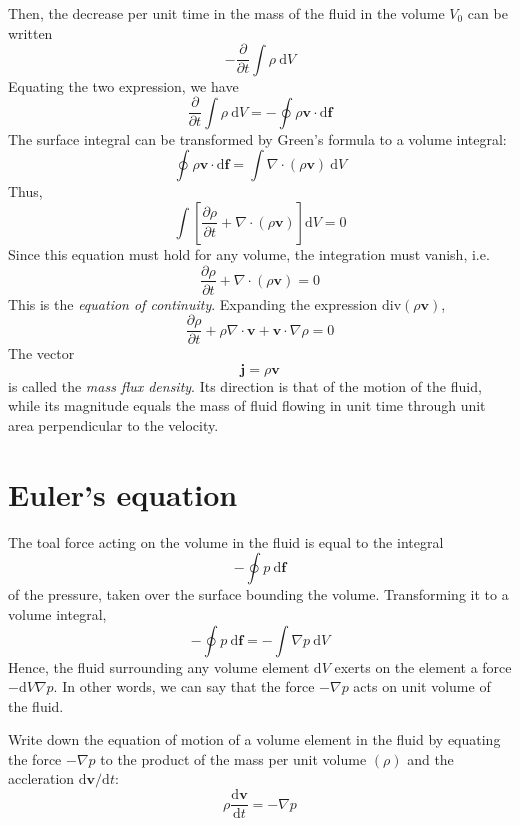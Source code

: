 \documentclass[conference]{IEEEtran}
\theoremstyle{definition}
\theoremstyle{remark}
\begin{document}
    Then, the decrease per unit time in the mass of the fluid in the volume $V_0$ can be written
    \[
        -\dfrac{\partial}{\partial t} \int \rho \ \mathrm{d} V
    \]
    Equating the two expression, we have
    \[
        \dfrac{\partial}{\partial t} \int \rho \ \mathrm{d} V = - \oint \rho \mathbf{v} \cdot \mathrm{d} \mathbf{f}
    \]
    The surface integral can be transformed by Green's formula to a volume integral:
    \[
        \oint \rho \mathbf{v} \cdot \mathrm{d} \mathbf{f} = \int \nabla \cdot (\rho \mathbf{v}) \ \mathrm{d} V
    \]
    Thus,
    \[
        \int \left[ \dfrac{\partial \rho}{\partial t} + \nabla \cdot (\rho \mathbf{v}) \right] \mathrm{d} V = 0
    \]
    Since this equation must hold for any volume, the integration must vanish, i.e.
    \begin{equation}
        \dfrac{\partial \rho}{\partial t} + \nabla \cdot (\rho \mathbf{v}) = 0
        \label{eq:continuity}
    \end{equation}
    This is the \emph{equation of continuity}. Expanding the expression $\text{div} (\rho \mathbf{v})$,
    \begin{equation}
        \dfrac{\partial \rho}{\partial t} + \rho \nabla \cdot \mathbf{v} + \mathbf{v} \cdot \nabla \rho = 0
    \end{equation}
    The vector
    \begin{equation}
        \mathbf{j} = \rho \mathbf{v}
    \end{equation}
    is called the \emph{mass flux density}. Its direction is that of the motion of the fluid, while its magnitude equals the mass of fluid flowing in unit time through unit area perpendicular to the velocity.

    \section{Euler's equation}
    The toal force acting on the volume in the fluid is equal to the integral
    \[
        -\oint p \ \mathrm{d} \mathbf{f}
    \]
    of the pressure, taken over the surface bounding the volume. Transforming it to a volume integral,
    \[
        -\oint p \ \mathrm{d} \mathbf{f} = - \int \nabla p \ \mathrm{d} V
    \]
    Hence, the fluid surrounding any volume element $\mathrm{d} V$ exerts on the element a force $-\mathrm{d} V \nabla p$. In other words, we can say that the force $-\nabla p$ acts on unit volume of the fluid.

    Write down the equation of motion of a volume element in the fluid by equating the force $-\nabla p$ to the product of the mass per unit volume $(\rho)$ and the accleration $\mathrm{d} \mathbf{v} / \mathrm{d} t$:
    \begin{equation}
        \rho \dfrac{\mathrm{d} \mathbf{v}}{\mathrm{d} t} = -\nabla p
        \label{eq:force}
    \end{equation}
\end{document}
